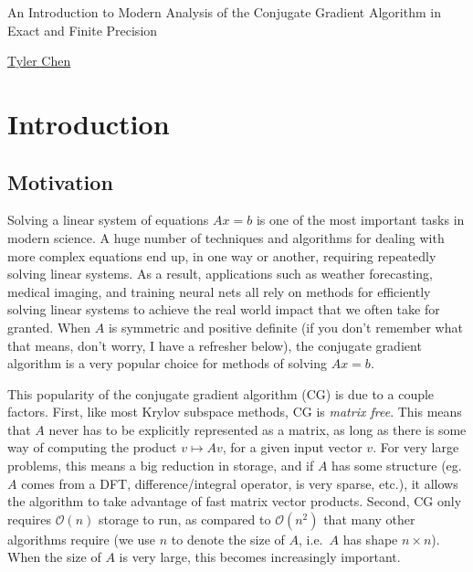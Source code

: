 \documentclass[10pt]{article}
\begin{document}
\begin{titlepage}
   \begin{center}
       \vspace{3em}
       \large
        
        {\sffamily\LARGE
        An Introduction to Modern Analysis of the Conjugate Gradient Algorithm in Exact and Finite Precision
        }
 
 
       \vspace{1.5cm}
 
       {\Large
        \href{https://chen.pw}{Tyler Chen}
       }
    \end{center}
\end{titlepage}


\section{Introduction}

\subsection{Motivation}

Solving a linear system of equations \(Ax=b\) is one of the most important tasks in modern science.
A huge number of techniques and algorithms for dealing with more complex equations end up, in one way or another, requiring repeatedly solving linear systems.
As a result, applications such as weather forecasting, medical imaging, and training neural nets all rely on methods for efficiently solving linear systems to achieve the real world impact that we often take for granted.
When \(A\) is symmetric and positive definite (if you don't remember what that means, don't worry, I have a refresher below), the conjugate gradient algorithm is a very popular choice for methods of solving \(Ax=b\).

This popularity of the conjugate gradient algorithm (CG) is due to a couple factors. First, like most Krylov subspace methods, CG is \emph{matrix free}.
This means that \(A\) never has to be explicitly represented as a matrix, as long as there is some way of computing the product \(v\mapsto Av\), for a given input vector \(v\).
For very large problems, this means a big reduction in storage, and if \(A\) has some structure (eg. \(A\) comes from a DFT, difference/integral operator, is very sparse, etc.), it allows the algorithm to take advantage of fast matrix vector products.
Second, CG only requires \(\mathcal{O}(n)\) storage to run, as compared to \(\mathcal{O}(n^2)\) that many other algorithms require (we use \(n\) to denote the size of \(A\), i.e.~\(A\) has shape \(n\times n\)).
When the size of \(A\) is very large, this becomes increasingly important.
\end{document}
